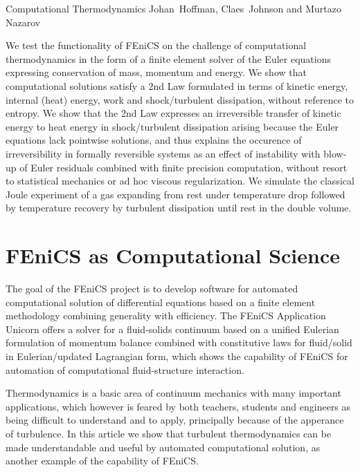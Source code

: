               {Computational Thermodynamics}
              {Johan~Hoffman, Claes~Johnson and Murtazo Nazarov} 


We test the functionality of FEniCS on the challenge of computational
thermodynamics in the form of a finite element solver of the Euler
equations expressing conservation of mass, momentum and energy. We
show that computational solutions satisfy a 2nd Law formulated in
terms of kinetic energy, internal (heat) energy, work and
shock/turbulent dissipation, without reference to entropy. We show
that the 2nd Law
expresses an irreversible transfer of kinetic energy to heat energy in
shock/turbulent dissipation arising because the Euler equations lack
pointwise solutions, and thus explains the occurence of
irreversibility in formally reversible systems as an effect of
instability with blow-up of Euler residuals combined with finite
precision computation, without resort to statistical mechanics or ad
hoc viscous regularization.
We simulate the classical Joule experiment of a gas expanding from
rest under temperature drop followed by temperature recovery by
turbulent dissipation until rest in the double volume.
 
\section{FEniCS as Computational Science}

The goal of the FEniCS project is to develop software for automated
computational solution of differential equations based on a finite
element methodology combining generality with efficiency. The FEniCS
Application Unicorn offers a solver for a fluid-solids continuum based
on a unified Eulerian formulation of momentum balance combined with
constitutive laws for fluid/solid in Eulerian/updated Lagrangian form,
which shows the capability of FEniCS for automation of computational
fluid-structure interaction.

Thermodynamics is a basic area of continuum mechanics with many
important applications, which however is feared by both teachers,
students and engineers as being difficult to understand and to apply,
principally because of the apperance of turbulence. In this article we
show that turbulent thermodynamics can be made understandable and
useful by automated computational solution, as another example of the
capability of FEniCS.

